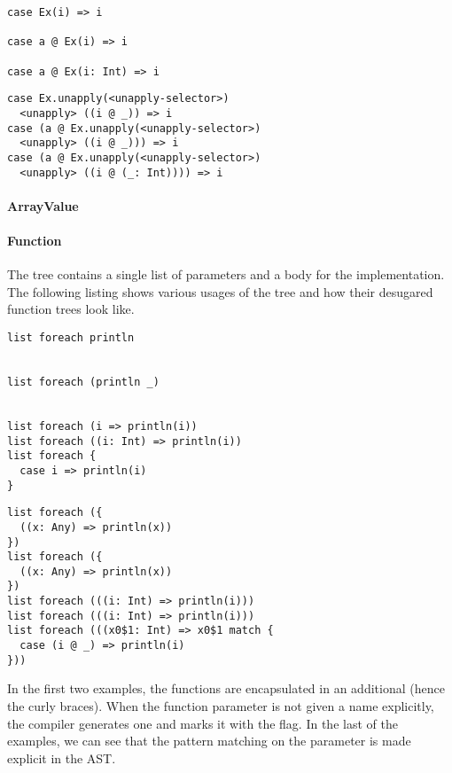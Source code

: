 \begin{multicols}{2}
\begin{lstlisting}
case Ex(i) => i

case a @ Ex(i) => i

case a @ Ex(i: Int) => i

\end{lstlisting}
\begin{lstlisting}
case Ex.unapply(<unapply-selector>) 
  <unapply> ((i @ _)) => i
case (a @ Ex.unapply(<unapply-selector>) 
  <unapply> ((i @ _))) => i
case (a @ Ex.unapply(<unapply-selector>) 
  <unapply> ((i @ (_: Int)))) => i
\end{lstlisting}
\end{multicols}




\paragraph{ArrayValue} 

\paragraph{Function} 

\noindent The  tree contains a single list of parameters and a body for the implementation. The following listing shows various usages of the  tree and how their desugared function trees look like.

\begin{multicols}{2}
\begin{lstlisting}
list foreach println


list foreach (println _)


list foreach (i => println(i))
list foreach ((i: Int) => println(i))
list foreach {
  case i => println(i)
}
\end{lstlisting}
\begin{lstlisting}
list foreach ({
  ((x: Any) => println(x))
})
list foreach ({
  ((x: Any) => println(x))
})
list foreach (((i: Int) => println(i)))
list foreach (((i: Int) => println(i)))
list foreach (((x0$1: Int) => x0$1 match {
  case (i @ _) => println(i)
}))
\end{lstlisting}
\end{multicols}

In the first two examples, the functions are encapsulated in an additional  (hence the curly braces). When the function parameter is not given a name explicitly, the compiler generates one and marks it with the  flag. In the last of the examples, we can see that the pattern matching on the parameter is made explicit in the AST.

